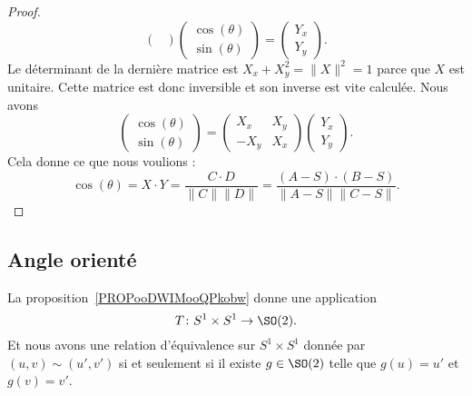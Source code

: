 \begin{proof}
\begin{equation}
\begin{pmatrix}
        \end{pmatrix}\begin{pmatrix}
            \cos(\theta)    \\ 
            \sin(\theta)    
        \end{pmatrix}=\begin{pmatrix}
            Y_x    \\ 
            Y_y    
        \end{pmatrix}.
    \end{equation}
    Le déterminant de la dernière matrice est \( X_x+X_y^2=\| X \|^2=1\) parce que \( X\) est unitaire. Cette matrice est donc inversible et son inverse est vite calculée. Nous avons
    \begin{equation}
        \begin{pmatrix}
            \cos(\theta)    \\ 
            \sin(\theta)    
        \end{pmatrix}=\begin{pmatrix}
            X_x    &   X_y    \\ 
            -X_y    &   X_x    
        \end{pmatrix}\begin{pmatrix}
            Y_x    \\ 
            Y_y    
        \end{pmatrix}.
    \end{equation}
    Cela donne ce que nous voulions :
    \begin{equation}
        \cos(\theta)=X\cdot Y=\frac{ C\cdot D }{ \| C \|\| D \| }=\frac{ (A-S)\cdot(B-S) }{ \| A-S \|\| C-S \| }.
    \end{equation}
\end{proof}


\subsection{Angle orienté}

La proposition~\ref{PROPooDWIMooQPkobw} donne une application
\begin{equation}
    T\colon S^1\times S^1\to \SO(2).
\end{equation}
Et nous avons une relation d'équivalence sur \( S^1\times S^1\) donnée par \( (u,v)\sim(u',v')\) si et seulement si il existe \( g\in\SO(2)\) telle que \( g(u)=u'\) et \( g(v)=v'\).

